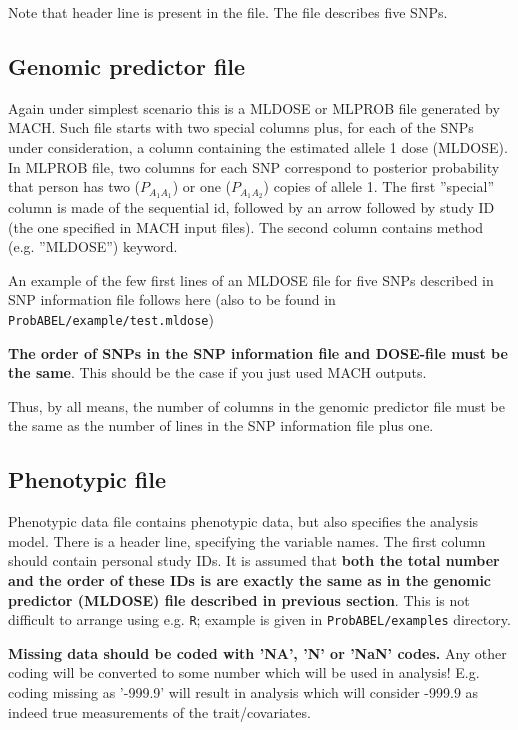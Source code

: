 \documentclass[12pt,a4paper]{article}
\begin{document}
Note that header line is present in the file. The file describes 
five SNPs. 

\subsection{Genomic predictor file}
\label{ssec:dosein}

Again under simplest scenario this is a MLDOSE or MLPROB file generated by MACH.
Such file starts with two special columns plus, for each of the SNPs 
under consideration, a column containing the estimated allele 1 dose (MLDOSE).
In MLPROB file, two columns for each SNP correspond to posterior probability 
that person has two ($P_{A_1A_1}$) or one ($P_{A_1A_2}$) copies of allele 1. 
The first ''special'' column is made of the sequential id, 
followed by an arrow followed by study ID (the one specified in 
MACH input files). The second column contains method 
(e.g. ''MLDOSE'') keyword.

An example of the few first lines of an MLDOSE file for 
five SNPs described in SNP information file follows here (also 
to be found in \texttt{ProbABEL/example/test.mldose})



\textbf{The order of SNPs in the SNP information file and DOSE-file
must be the same}. This should be the case if you just used MACH outputs.

Thus, by all means, the number of columns in the genomic predictor file 
must be the same as the number of lines in the SNP information file plus one. 

\subsection{Phenotypic file}
\label{ssec:phenoin}

Phenotypic data file contains phenotypic data, but also specifies the 
analysis model. There is a header line, specifying the variable names. 
The first column should contain personal study IDs. It is assumed 
that \textbf{both the total number and the order of these IDs is are 
exactly the same as in the genomic predictor (MLDOSE) file described in 
previous section}. This is not difficult to arrange using e.g. \texttt{R}; 
example is given in \texttt{ProbABEL/examples} directory. 

\textbf{Missing data should be coded with 'NA', 'N' or 'NaN' codes.} Any 
other coding will be converted to some number which will be used in 
analysis! E.g. coding missing as '-999.9' will result in analysis which 
will consider -999.9 as indeed true measurements of the trait/covariates.  
\end{document}
